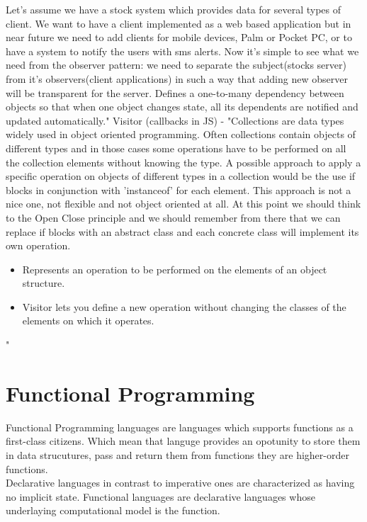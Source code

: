 \documentclass{llncs}
\begin{document}
Let's assume we have a stock system which provides data for several types of client. We want to have a client implemented as a web based application but in near future we need to add clients for mobile devices, Palm or Pocket PC, or to have a system to notify the users with sms alerts. Now it's simple to see what we need from the observer pattern: we need to separate the subject(stocks server) from it's observers(client applications) in such a way that adding new observer will be transparent for the server.
Defines a one-to-many dependency between objects so that when one object changes state, all its dependents are notified and updated automatically."\cite{oosite}
Visitor (callbacks in JS) - "Collections are data types widely used in object oriented programming. Often collections contain objects of different types and in those cases some operations have to be performed on all the collection elements without knowing the type.
A possible approach to apply a specific operation on objects of different types in a collection would be the use if blocks in conjunction with 'instanceof' for each element. This approach is not a nice one, not flexible and not object oriented at all. At this point we should think to the Open Close principle and we should remember from there that we can replace if blocks with an abstract class and each concrete class will implement its own operation.
\begin{itemize}
\item Represents an operation to be performed on the elements of an object structure.
\item Visitor lets you define a new operation without changing the classes of the elements on which it operates.
\end{itemize}
"\cite{oosite}\\


\section{Functional Programming}
Functional Programming languages are languages which supports functions as a first-class citizens. Which mean that languge provides an opotunity to store them in data strucutures, pass and return them from functions they are higher-order functions\cite{Hudak}.\\

Declarative languages in contrast to imperative ones  are characterized as having no implicit state. Functional languages are declarative languages whose underlaying computational model is the function.\cite{Hudak}\\
\end{document}
